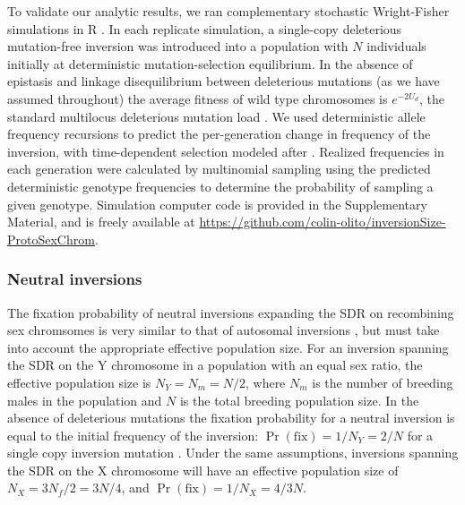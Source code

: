 \documentclass{article}
\begin{document}
To validate our analytic results, we ran complementary stochastic Wright-Fisher simulations in R \citep{RSoftware}. In each replicate simulation, a single-copy deleterious mutation-free inversion was introduced into a population with $N$ individuals initially at deterministic mutation-selection equilibrium. In the absence of epistasis and linkage disequilibrium between deleterious mutations (as we have assumed throughout) the average fitness of wild type chromosomes is $e^{-2 U_d}$, the standard multilocus deleterious mutation load \citep{Haldane1937,AgrawalWhitlock2012}. We used deterministic allele frequency recursions to predict the per-generation change in frequency of the inversion, with time-dependent selection modeled after \citet{Nei1967}. Realized frequencies in each generation were calculated by multinomial sampling using the predicted deterministic genotype frequencies to determine the probability of sampling a given genotype. Simulation computer code is provided in the Supplementary Material, and is freely available at  \url{https://github.com/colin-olito/inversionSize-ProtoSexChrom}.

\subsubsection*{Neutral inversions}

The fixation probability of neutral inversions expanding the SDR on recombining sex chromsomes is very similar to that of autosomal inversions \citep{ConnallonOlito2020}, but must take into account the appropriate effective population size. For an inversion spanning the SDR on the Y chromosome in a population with an equal sex ratio, the effective population size is $N_Y = N_m = N/2$, where $N_m$ is the number of breeding males in the population and $N$ is the total breeding population size. In the absence of deleterious mutations the fixation probability for a neutral inversion is equal to the initial frequency of the inversion: $\Pr(\text{fix}) = 1/N_Y = 2/N$ for a single copy inversion mutation \citep{Kimura1962, CrowKimura1970}. Under the same assumptions, inversions spanning the SDR on the X chromosome will have an effective population size of $N_X = 3 N_f/2 = 3 N/4 $, and $\Pr(\text{fix}) = 1/N_X = 4/3N$. 
\end{document}
